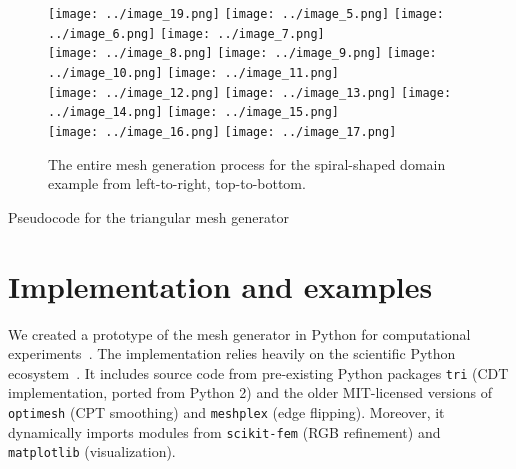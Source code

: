 \documentclass[12pt]{rmstyle}
\begin{document}
\begin{figure}[htbp]
  \centering
  \texttt{[image: ../image\_19.png]}
  \texttt{[image: ../image\_5.png]}
  \texttt{[image: ../image\_6.png]}
  \texttt{[image: ../image\_7.png]}\\
  \texttt{[image: ../image\_8.png]}
  \texttt{[image: ../image\_9.png]}
  \texttt{[image: ../image\_10.png]}
  \texttt{[image: ../image\_11.png]}\\
  \texttt{[image: ../image\_12.png]}
  \texttt{[image: ../image\_13.png]}
  \texttt{[image: ../image\_14.png]}
  \texttt{[image: ../image\_15.png]}\\
  \texttt{[image: ../image\_16.png]}
  \texttt{[image: ../image\_17.png]}
  \hspace{0.48\textwidth}
  \caption{The entire mesh generation process for the spiral-shaped domain
    example from left-to-right, top-to-bottom.}
\label{fig:spiralexample}
\end{figure}

\begin{algorithm}[H]
  \caption{Pseudocode for the triangular mesh generator}
  \label{alg:meshgen}
  \begin{algorithmic}[1]
    \Statex
    \EndFor
    \State {}
    \EndFunction
  \end{algorithmic}
\end{algorithm}


\section{Implementation and examples}

We created a prototype of the mesh generator in Python for computational
experiments~\cite{adaptmesh2020}.  The implementation relies heavily on the
scientific Python ecosystem~\cite{virtanen2020scipy}.  It includes source code
from pre-existing Python packages \verb|tri| \cite{tri} (CDT implementation,
ported from Python 2) and the older MIT-licensed versions of \verb|optimesh|
\cite{optimesh} (CPT smoothing) and \verb|meshplex| \cite{meshplex} (edge
flipping).  Moreover, it dynamically imports modules from \verb|scikit-fem|
\cite{gustafsson2020scikit} (RGB refinement) and \verb|matplotlib|
\cite{hunter2007matplotlib} (visualization).
\end{document}
